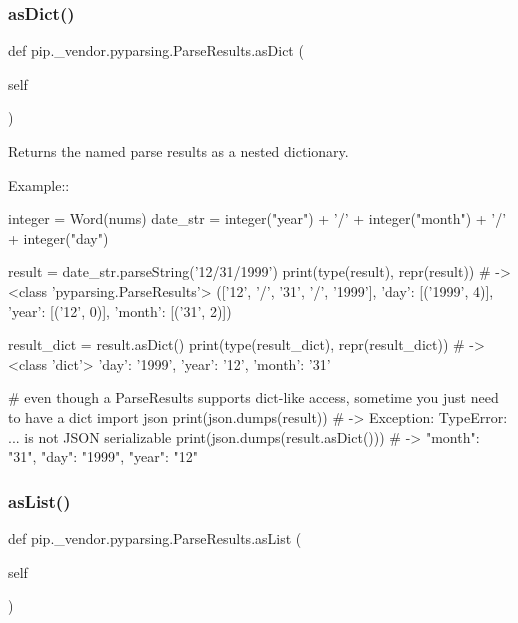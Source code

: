 \subsubsection{\texorpdfstring{as\+Dict()}{asDict()}}
{\footnotesize\ttfamily def pip.\+\_\+vendor.\+pyparsing.\+Parse\+Results.\+as\+Dict (\begin{DoxyParamCaption}\item[{}]{self }\end{DoxyParamCaption})}

\begin{DoxyVerb}Returns the named parse results as a nested dictionary.

Example::

    integer = Word(nums)
    date_str = integer("year") + '/' + integer("month") + '/' + integer("day")

    result = date_str.parseString('12/31/1999')
    print(type(result), repr(result)) # -> <class 'pyparsing.ParseResults'> (['12', '/', '31', '/', '1999'], {'day': [('1999', 4)], 'year': [('12', 0)], 'month': [('31', 2)]})

    result_dict = result.asDict()
    print(type(result_dict), repr(result_dict)) # -> <class 'dict'> {'day': '1999', 'year': '12', 'month': '31'}

    # even though a ParseResults supports dict-like access, sometime you just need to have a dict
    import json
    print(json.dumps(result)) # -> Exception: TypeError: ... is not JSON serializable
    print(json.dumps(result.asDict())) # -> {"month": "31", "day": "1999", "year": "12"}
\end{DoxyVerb}
 \mbox{\label{classpip_1_1__vendor_1_1pyparsing_1_1ParseResults_a0ab042edd2e7a65684f0c89d7b523f67}} 
\subsubsection{\texorpdfstring{as\+List()}{asList()}}
{\footnotesize\ttfamily def pip.\+\_\+vendor.\+pyparsing.\+Parse\+Results.\+as\+List (\begin{DoxyParamCaption}\item[{}]{self }\end{DoxyParamCaption})}

